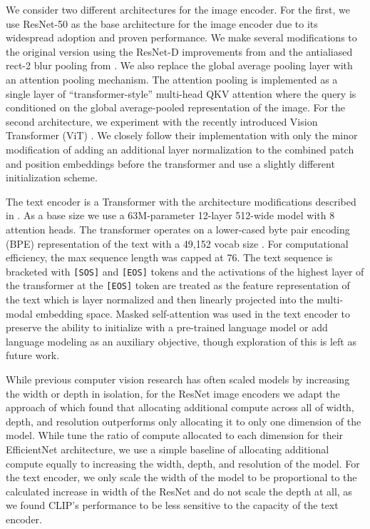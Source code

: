 \documentclass{article}
\begin{document}
We consider two different architectures for the image encoder. For the first, we use ResNet-50 \citep{he2016deep} as the base architecture for the image encoder due to its widespread adoption and proven performance. We make several modifications to the original version using the ResNet-D improvements from \citet{he2019bag} and the antialiased rect-2 blur pooling from \citet{zhang2019making}. We also replace the global average pooling layer with an attention pooling mechanism. The attention pooling is implemented as a single layer of ``transformer-style'' multi-head QKV attention where the query is conditioned on the global average-pooled representation of the image. For the second architecture, we experiment with the recently introduced Vision Transformer (ViT) \citep{dosovitskiy2020image}. We closely follow their implementation with only the minor modification of adding an additional layer normalization to the combined patch and position embeddings before the transformer and use a slightly different initialization scheme.

The text encoder is a Transformer \citep{vaswani2017attention} with the architecture modifications described in \citet{radford2019language}. As a base size we use a 63M-parameter 12-layer 512-wide model with 8 attention heads. The transformer operates on a lower-cased byte pair encoding (BPE) representation of the text with a 49,152 vocab size \citep{sennrich2015neural}. For computational efficiency, the max sequence length was capped at 76. The text sequence is bracketed with \texttt{[SOS]} and \texttt{[EOS]} tokens and the activations of the highest layer of the transformer at the \texttt{[EOS]} token are treated as the feature representation of the text which is layer normalized and then linearly projected into the multi-modal embedding space. Masked self-attention was used in the text encoder to preserve the ability to initialize with a pre-trained language model or add language modeling as an auxiliary objective, though exploration of this is left as future work.



While previous computer vision research has often scaled models by increasing the width \citep{mahajan2018exploring} or depth \citep{he2016deep} in isolation, for the ResNet image encoders we adapt the approach of \citet{tan2019efficientnet} which found that allocating additional compute across all of width, depth, and resolution outperforms only allocating it to only one dimension of the model. While \citet{tan2019efficientnet} tune the ratio of compute allocated to each dimension for their EfficientNet architecture, we use a simple baseline of allocating additional compute equally to increasing the width, depth, and resolution of the model. For the text encoder, we only scale the width of the model to be proportional to the calculated increase in width of the ResNet and do not scale the depth at all, as we found CLIP's performance to be less sensitive to the capacity of the text encoder.
\end{document}
